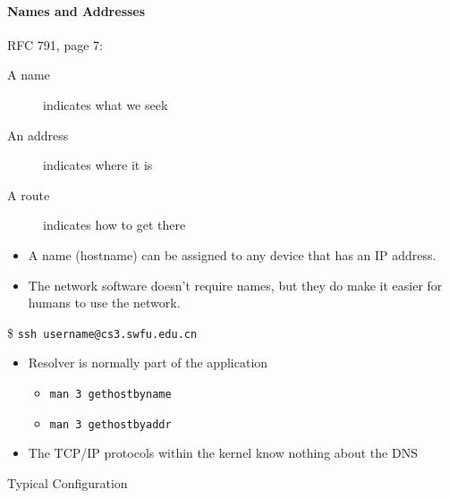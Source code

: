 \begin{frame}\framesubtitle{Names and Addresses}
  \begin{iblock}{RFC 791, page 7:}
    \begin{description}
    \item[A name] indicates what we seek
    \item[An address] indicates where it is
    \item[A route] indicates how to get there
    \end{description}
  \end{iblock}
  \begin{itemize}
  \item A name (hostname) can be assigned to any device that has an IP address.
  \item The network software doesn't require names, but they do make it easier for humans
    to use the network.
  \end{itemize}
\end{frame}

\begin{frame}
  \begin{iblock}{\$ \texttt{ssh username@cs3.swfu.edu.cn}}
    \centering
    \mode<beamer>{ \texttt{[image: resolver]} }%
  \end{iblock}
  \begin{itemize}
  \item Resolver is normally part of the application
    \begin{itemize}
    \item \texttt{man 3 gethostbyname}
    \item \texttt{man 3 gethostbyaddr}
    \end{itemize}
  \item The TCP/IP protocols within the kernel know nothing about the DNS
  \end{itemize}
\end{frame}

\begin{frame}{Typical Configuration}
  \begin{center}
     
  \end{center}
\end{frame}

